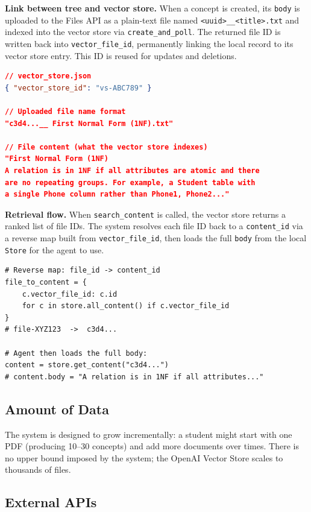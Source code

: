 \documentclass[12pt,a4paper]{article}
\begin{document}
\textbf{Link between tree and vector store.}
When a concept is created, its \texttt{body} is uploaded to the Files API as
a plain-text file named \texttt{<uuid>\_\_<title>.txt} and indexed into the
vector store via \texttt{create\_and\_poll}. The returned file ID is written
back into \texttt{vector\_file\_id}, permanently linking the local record to
its vector store entry. This ID is reused for updates and deletions.

\begin{lstlisting}[language=json,numbers=none]
// vector_store.json
{ "vector_store_id": "vs-ABC789" }

// Uploaded file name format
"c3d4...__ First Normal Form (1NF).txt"

// File content (what the vector store indexes)
"First Normal Form (1NF)
A relation is in 1NF if all attributes are atomic and there
are no repeating groups. For example, a Student table with
a single Phone column rather than Phone1, Phone2..."
\end{lstlisting}

\textbf{Retrieval flow.}
When \texttt{search\_content} is called, the vector store returns a ranked
list of file IDs. The system resolves each file ID back to a \texttt{content\_id}
via a reverse map built from \texttt{vector\_file\_id}, then loads the full
\texttt{body} from the local \texttt{Store} for the agent to use.

\begin{lstlisting}
# Reverse map: file_id -> content_id
file_to_content = {
    c.vector_file_id: c.id
    for c in store.all_content() if c.vector_file_id
}
# file-XYZ123  ->  c3d4...

# Agent then loads the full body:
content = store.get_content("c3d4...")
# content.body = "A relation is in 1NF if all attributes..."
\end{lstlisting}

\subsection{Amount of Data}

The system is designed to grow incrementally: a student might start with
one PDF (producing 10--30 concepts) and add more documents over times.
There is no upper bound imposed by the system; the OpenAI Vector Store scales to thousands of files.

\subsection{External APIs}
\end{document}
